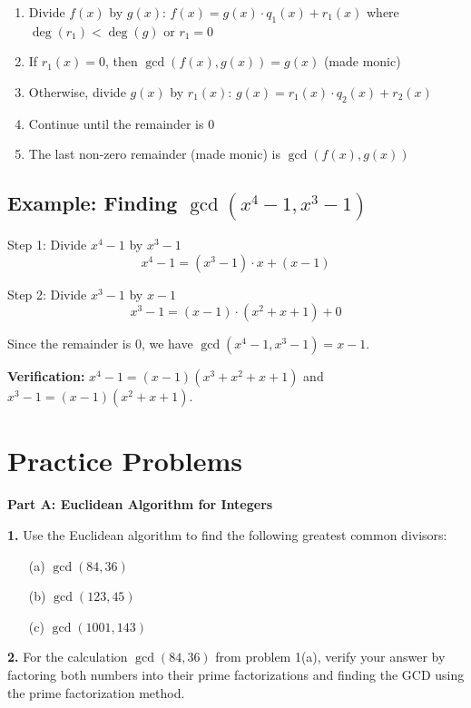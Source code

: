 \documentclass[12pt]{article}
\begin{document}
\begin{enumerate}
\item Divide $f(x)$ by $g(x)$: $f(x) = g(x) \cdot q_1(x) + r_1(x)$ where $\deg(r_1) < \deg(g)$ or $r_1 = 0$
\item If $r_1(x) = 0$, then $\gcd(f(x), g(x)) = g(x)$ (made monic)
\item Otherwise, divide $g(x)$ by $r_1(x)$: $g(x) = r_1(x) \cdot q_2(x) + r_2(x)$
\item Continue until the remainder is $0$
\item The last non-zero remainder (made monic) is $\gcd(f(x), g(x))$
\end{enumerate}

\subsection{Example: Finding $\gcd(x^4 - 1, x^3 - 1)$}

Step 1: Divide $x^4 - 1$ by $x^3 - 1$
$$x^4 - 1 = (x^3 - 1) \cdot x + (x - 1)$$

Step 2: Divide $x^3 - 1$ by $x - 1$
$$x^3 - 1 = (x - 1) \cdot (x^2 + x + 1) + 0$$

Since the remainder is $0$, we have $\gcd(x^4 - 1, x^3 - 1) = x - 1$.

\textbf{Verification:} $x^4 - 1 = (x-1)(x^3 + x^2 + x + 1)$ and $x^3 - 1 = (x-1)(x^2 + x + 1)$.

\newpage

\section{Practice Problems}

\textbf{Part A: Euclidean Algorithm for Integers}

\textbf{1.} Use the Euclidean algorithm to find the following greatest common divisors:

\begin{enumerate}
\item[(a)] $\gcd(84, 36)$
\vspace{3cm}

\item[(b)] $\gcd(123, 45)$
\vspace{3cm}

\item[(c)] $\gcd(1001, 143)$
\vspace{3cm}
\end{enumerate}

\textbf{2.} For the calculation $\gcd(84, 36)$ from problem 1(a), verify your answer by factoring both numbers into their prime factorizations and finding the GCD using the prime factorization method.
\vspace{3cm}
\end{document}
